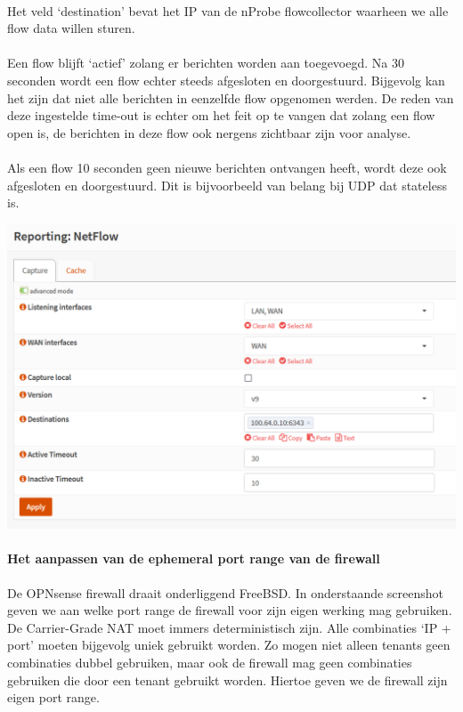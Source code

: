 \paragraph{}
Het veld ‘destination’ bevat het IP van de nProbe flowcollector waarheen we alle flow data willen sturen.

\paragraph{}
Een flow blijft ‘actief’ zolang er berichten worden aan toegevoegd. Na 30 seconden wordt een flow echter steeds afgesloten en doorgestuurd. Bijgevolg kan het zijn dat niet alle berichten in eenzelfde flow opgenomen werden. De reden van deze ingestelde time-out is echter om het feit op te vangen dat zolang een flow open is, de berichten in deze flow ook nergens zichtbaar zijn voor analyse.

\paragraph{}
Als een flow 10 seconden geen nieuwe berichten ontvangen heeft, wordt deze ook afgesloten en doorgestuurd. Dit is bijvoorbeeld van belang bij UDP dat stateless is.

\includegraphics[width=\textwidth]{./graphics/opnsense_netflow_conf.PNG}

\paragraph{Het aanpassen van de ephemeral port range van de firewall}
De OPNsense firewall draait onderliggend FreeBSD. In onderstaande screenshot geven we aan welke port range de firewall voor zijn eigen werking mag gebruiken. De Carrier-Grade NAT moet immers deterministisch zijn. Alle combinaties ‘IP + port’ moeten bijgevolg uniek gebruikt worden. Zo mogen niet alleen tenants geen combinaties dubbel gebruiken, maar ook de firewall mag geen combinaties gebruiken die door een tenant gebruikt worden. Hiertoe geven we de firewall zijn eigen port range.

